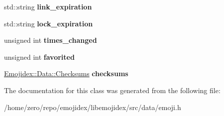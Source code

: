 \begin{DoxyCompactItemize}
\item 
std\+::string {\bfseries link\+\_\+expiration}\hypertarget{classEmojidex_1_1Data_1_1Emoji_abd597aeadcd7200b1699b61b70b0b183}{}\label{classEmojidex_1_1Data_1_1Emoji_abd597aeadcd7200b1699b61b70b0b183}

\item 
std\+::string {\bfseries lock\+\_\+expiration}\hypertarget{classEmojidex_1_1Data_1_1Emoji_ab89f5f4534ea2f04093a314304514786}{}\label{classEmojidex_1_1Data_1_1Emoji_ab89f5f4534ea2f04093a314304514786}

\item 
unsigned int {\bfseries times\+\_\+changed}\hypertarget{classEmojidex_1_1Data_1_1Emoji_a259f6b01221b548c048612b1c73cdf95}{}\label{classEmojidex_1_1Data_1_1Emoji_a259f6b01221b548c048612b1c73cdf95}

\item 
unsigned int {\bfseries favorited}\hypertarget{classEmojidex_1_1Data_1_1Emoji_ace2b4c0ce6c36f8b8562f2494aa4c306}{}\label{classEmojidex_1_1Data_1_1Emoji_ace2b4c0ce6c36f8b8562f2494aa4c306}

\item 
\hyperlink{classEmojidex_1_1Data_1_1Checksums}{Emojidex\+::\+Data\+::\+Checksums} {\bfseries checksums}\hypertarget{classEmojidex_1_1Data_1_1Emoji_aa0c2638f3d68e538a247e22ad70f6255}{}\label{classEmojidex_1_1Data_1_1Emoji_aa0c2638f3d68e538a247e22ad70f6255}

\end{DoxyCompactItemize}


The documentation for this class was generated from the following file\+:\begin{DoxyCompactItemize}
\item 
/home/zero/repo/emojidex/libemojidex/src/data/emoji.\+h\end{DoxyCompactItemize}

